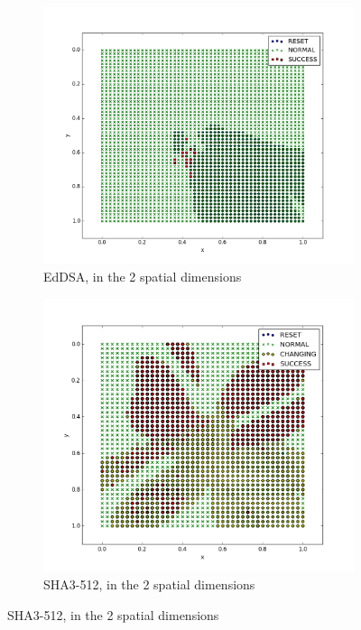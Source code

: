 \documentclass[times, utf8, diplomski]{fer}
\begin{document}
\begin{figure}[htbp]
    \centering
    \begin{subfigure}[b]{0.48\textwidth}
        \includegraphics[width=0.95\linewidth]{images/plots/EdDSA_space_all_2D.png}
        \caption{EdDSA, in the 2 spatial dimensions}
    \end{subfigure}
    \hspace{8pt}
    \begin{subfigure}[b]{0.48\textwidth}
        \includegraphics[width=0.95\linewidth]{images/plots/Keccak_space_all_2D.png}
        \caption{SHA3-512, in the 2 spatial dimensions}
    \end{subfigure}


\end{figure}
\end{document}
